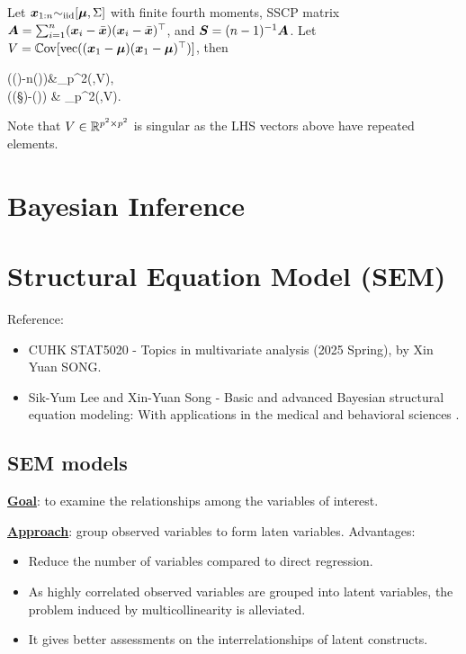 \documentclass[10pt,a4paper]{book}
\begin{document}
\begin{thmbox}
	\begin{theorem}\label{thm:CLT_multi_sampleCov_iid}
		Let ${\boldsymbol x}_{1:n}{\sim}_{\mathrm{iid}}[{\boldsymbol\mu},\Sigma]$ with finite fourth moments, SSCP matrix ${\boldsymbol A}=\sum_{i=1}^{n}({\boldsymbol x}_i-\bar{{\boldsymbol x}})({\boldsymbol x}_i-\bar{{\boldsymbol x}})^\top$, and ${\boldsymbol S}=(n-1)^{-1}{\boldsymbol A}$. Let $V=\mathbb{C}\mathrm{ov}[{\mathrm{vec}}(({\boldsymbol x}_1-{\boldsymbol\mu})({\boldsymbol x}_1-{\boldsymbol\mu})^\top)]$, then 
		\begin{sequation*}
			\begin{aligned}
				(\vec(\A)-n\cdot\vec(\Sigma))&\dto \rmN_{p^2}(\0,V), \\
				(\vec(\S)-\vec(\Sigma)) & \dto \rmN_{p^2}(\0,V).
			\end{aligned}
		\end{sequation*}
	\end{theorem}
\end{thmbox}
Note that $V\in\mathbb R^{p^2\times p^2}$ is singular as the LHS vectors above have repeated elements. 


\chapter{Bayesian Inference}\label{chap:bayes_inference}



\chapter{Structural Equation Model (SEM)}\label{chap:SEM}
Reference: 
\begin{itemize}
	\item CUHK STAT5020 - Topics in multivariate analysis (2025 Spring), by Xin Yuan SONG.
	\item Sik-Yum Lee and Xin-Yuan Song - Basic and advanced
	Bayesian structural equation modeling: With applications in the
	medical and behavioral sciences \cite{lee2012basic}.
\end{itemize}

\section{SEM models}\label{sec:SEM_models}
\textbf{\underline{Goal}}: to examine the relationships among the variables of interest.

\noindent \textbf{\underline{Approach}}: group observed variables to form laten variables. Advantages:
\begin{itemize}
	\item Reduce the number of variables compared to direct regression.
	\item As highly correlated observed variables are grouped into latent variables, the problem induced by multicollinearity is alleviated.
	\item It gives better assessments on the interrelationships of latent constructs.
\end{itemize}
\end{document}
